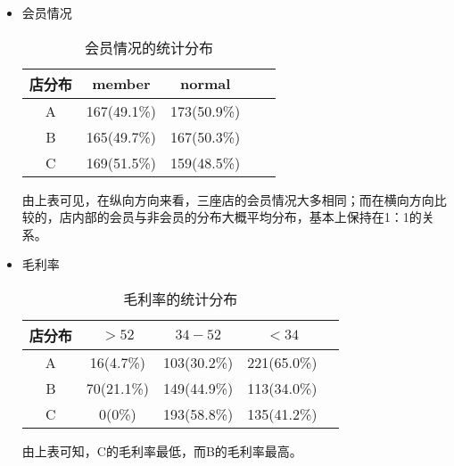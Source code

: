 \documentclass[withoutpreface,bwprint]{cumcmthesis}
\begin{document}
\begin{itemize}[itemindent=2em]
\item 会员情况
\par
\begin{table}[H]
    \caption{会员情况的统计分布}%
    \centering
    \fontsize{12}{14}\selectfont   
    \begin{tabular}{ccccc}
        \toprule[1.5pt]
        店分布 & member & normal \\
        \midrule[1pt]
        A & 167(49.1\%) & 173(50.9\%)  \\
        B & 165(49.7\%) & 167(50.3\%)  \\
        C & 169(51.5\%) & 159(48.5\%)  \\
        \bottomrule[1.5pt]
    \end{tabular}
\end{table}
\par
由上表可见，在纵向方向来看，三座店的会员情况大多相同；而在横向方向比较的，店内部的会员与非会员的分布大概平均分布，基本上保持在1：1的关系。




\item 毛利率
\begin{table}[H]
    \caption{毛利率的统计分布}%
    \centering
    \fontsize{12}{14}\selectfont   
    \begin{tabular}{ccccc}
        \toprule[1.5pt]
        店分布 & $>52$ & $34-52$ & $<34$ \\
        \midrule[1pt]
        A & 16(4.7\%) &103(30.2\%) & 221(65.0\%) \\
        B & 70(21.1\%) & 149(44.9\%) & 113(34.0\%) \\
        C & 0(0\%) & 193(58.8\%) & 135(41.2\%) \\
        \bottomrule[1.5pt]
    \end{tabular}
\end{table}
由上表可知，C的毛利率最低，而B的毛利率最高。



\end{itemize}
\end{document}
